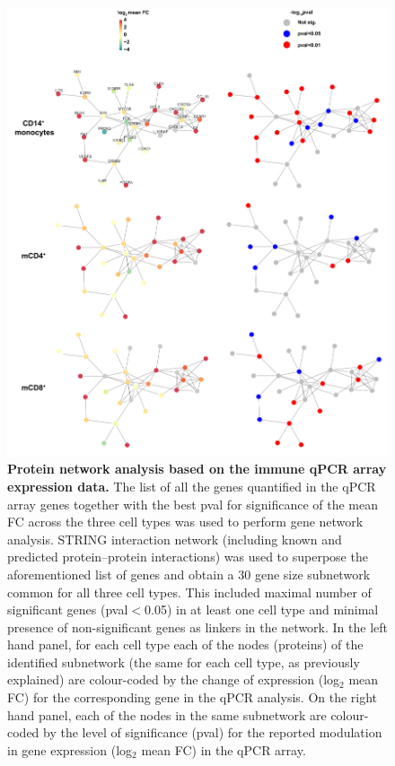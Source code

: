 \begin{figure}[htbp]
\centering
\includegraphics[width=\textwidth]{./Results3/pdfs/PSA_PCR_array_network_analysis}
\caption[Protein network analysis based on the immune qPCR array expression data.]{\textbf{Protein network analysis based on the immune qPCR array expression data.} The list of all the genes quantified in the qPCR array genes together with the best pval for significance of the mean FC across the three cell types was used to perform gene network analysis. STRING interaction network (including known and predicted protein–protein interactions) was used to superpose the aforementioned list of genes and obtain a 30 gene size subnetwork common for all three cell types. This included maximal number of significant genes (pval$<$0.05) in at least one cell type and minimal presence of non-significant genes as linkers in the network. In the left hand panel, for each cell type each of the nodes (proteins) of the identified subnetwork (the same for each cell type, as previously explained) are colour-coded by the change of expression (log${_2}$ mean FC) for the corresponding gene in the qPCR analysis. On the right hand panel, each of the nodes in the same subnetwork are colour-coded by the level of significance (pval) for the reported modulation in gene expression (log${_2}$ mean FC) in the qPCR array.}
\label{figure:PSA_PCR_network_analysis}
\end{figure}


